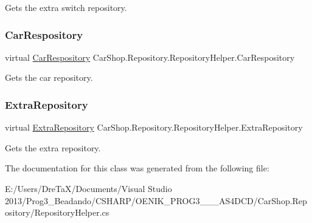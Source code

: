 Gets the extra switch repository. 

\mbox{\label{class_car_shop_1_1_repository_1_1_repository_helper_a63ab2fcf9cae79052f747303adaabe53}} 
\subsubsection{\texorpdfstring{Car\+Respository}{CarRespository}}
{\footnotesize\ttfamily virtual \mbox{\hyperlink{class_car_shop_1_1_repository_1_1_car_respository}{Car\+Respository}} Car\+Shop.\+Repository.\+Repository\+Helper.\+Car\+Respository\hspace{0.3cm}{\ttfamily [get]}}



Gets the car repository. 

\mbox{\label{class_car_shop_1_1_repository_1_1_repository_helper_af31c5cb06afd7fb40b31dd59877d9989}} 
\subsubsection{\texorpdfstring{Extra\+Repository}{ExtraRepository}}
{\footnotesize\ttfamily virtual \mbox{\hyperlink{class_car_shop_1_1_repository_1_1_extra_repository}{Extra\+Repository}} Car\+Shop.\+Repository.\+Repository\+Helper.\+Extra\+Repository\hspace{0.3cm}{\ttfamily [get]}}



Gets the extra repository. 



The documentation for this class was generated from the following file\+:\begin{DoxyCompactItemize}
\item 
E\+:/\+Users/\+Dre\+Ta\+X/\+Documents/\+Visual Studio 2013/\+Prog3\+\_\+\+Beadando/\+C\+S\+H\+A\+R\+P/\+O\+E\+N\+I\+K\+\_\+\+P\+R\+O\+G3\+\_\+\_\+\_\+\+A\+S4\+D\+C\+D/\+Car\+Shop.\+Repository/Repository\+Helper.\+cs\end{DoxyCompactItemize}
